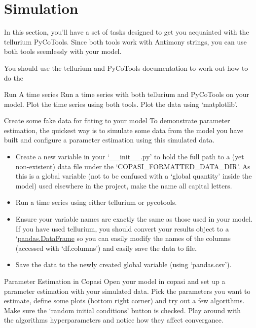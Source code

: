 \documentclass[../../main]{subfiles}
\begin{document}
\section{Simulation}
In this section, you'll have a set of tasks designed to get you acquainted with the tellurium
PyCoTools. Since both tools work with Antimony strings, you can use both tools seemlessly
with your model.

You should use the tellurium and PyCoTools documentation to work out how to do the

\begin{Task}[label=TimeSeries]{Run A time series}
Run a time series with both tellurium and PyCoTools on your model. Plot the time series using both tools.
    Plot the data using `matplotlib'.
\end{Task}

\begin{Task}[label=CreateFakeData]{Create some fake data for fitting to your model}
    To demonstrate parameter estimation, the quickest way is to simulate some data from the
    model you have built and configure a parameter estimation using this simulated data.
    \begin{itemize}
        \item Create a new variable in your `\_\_init\_\_.py' to hold the full path to a
        (yet non-existent) data file under the `COPASI\_FORMATTED\_DATA\_DIR'.
        As this is a global variable (not to be confused with a `global quantity' inside the model)
        used elsewhere in the project, make the name all capital letters.
        \item Run a time series using either tellurium or pycotools.
        \item Ensure your variable names are exactly the same as those used in your model. If you have used
        tellurium, you should convert your results object to a
        `\href{https://pandas.pydata.org/pandas-docs/stable/reference/api/pandas.DataFrame.html}{pandas.DataFrame} so you can easily
        modify the names of the columns (accessed with `df.columns') and easily save the data to file.
        \item Save the data to the newly created global variable (using `pandas.csv').
    \end{itemize}
\end{Task}

\begin{Task}[label=ManualParameterEstimation]{Parameter Estimation in Copasi}
    Open your model in copasi and set up a parameter estimation with your simulated data. Pick the
    parameters you want to estimate, define some plots (bottom right corner) and try out a few algorithms.
    Make sure the `random initial conditions' button is checked. Play around with the algorithms hyperparameters and
    notice how they affect convergance.
\end{Task}
\end{document}

